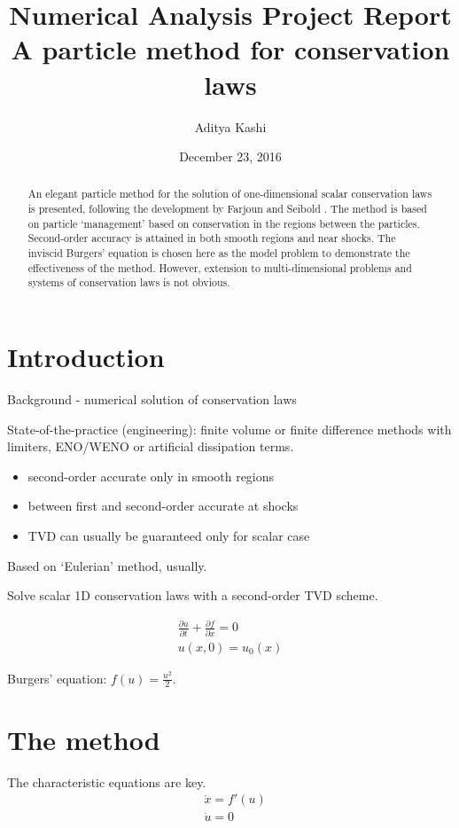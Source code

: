 \documentclass{article}
\author{Aditya Kashi}
\date{December 23, 2016}
\title{Numerical Analysis Project Report \\ \textbf{A particle method for conservation laws}}
\begin{document}
\maketitle

\begin{abstract}
An elegant particle method for the solution of one-dimensional scalar conservation laws is presented, following the development by Farjoun and Seibold \cite{particle}. The method is based on particle `management' based on conservation in the regions between the particles. Second-order accuracy is attained in both smooth regions and near shocks. The inviscid Burgers' equation is chosen here as the model problem to demonstrate the effectiveness of the method. However, extension to multi-dimensional problems and systems of conservation laws is not obvious.
\end{abstract}

\section{Introduction}
Background - numerical solution of conservation laws

State-of-the-practice (engineering): finite volume or finite difference methods with limiters, ENO/WENO or artificial dissipation terms.
\begin{itemize}
	\item second-order accurate only in smooth regions
	\item between first and second-order accurate at shocks
	\item TVD can usually be guaranteed only for scalar case
\end{itemize}
Based on `Eulerian' method, usually.


Solve scalar 1D conservation laws with a second-order TVD scheme.

\begin{align}
\frac{\partial u}{\partial t} + \frac{\partial f}{\partial x} = 0 \\
u(x,0) = u_0(x)
\label{eq:problem}
\end{align}

Burgers' equation: $f(u) = \frac{u^2}{2}$.
 

\section{The method}

The characteristic equations are key. \cite{particle}
\begin{align}
&\dot{x} = f'(u) \\
&\dot{u} = 0
\end{align}
\end{document}
